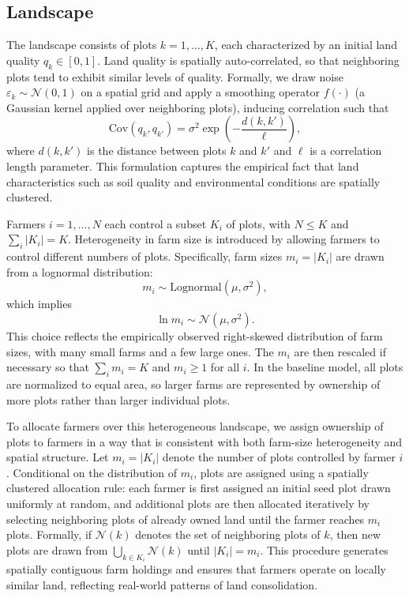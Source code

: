 \documentclass{article}
\begin{document}
\subsection{Landscape}
The landscape consists of plots $k = 1, \dots, K$, each characterized by an initial land quality $q_k \in [0,1]$. Land quality is spatially auto-correlated, so that neighboring plots tend to exhibit similar levels of quality. Formally, we draw noise $\varepsilon_k \sim \mathcal{N}(0,1)$ on a spatial grid and apply a smoothing operator  $f(\cdot)$ (a Gaussian kernel applied over neighboring plots), inducing correlation such that
\[
\text{Cov}(q_k, q_{k'}) = \sigma^2 \exp\left(-\frac{d(k,k')}{\ell}\right),
\]
where $d(k,k')$ is the distance between plots $k$ and $k'$ and $\ell$ is a correlation length parameter. This formulation captures the empirical fact that land characteristics such as soil quality and environmental conditions are spatially clustered.

Farmers $i = 1,\dots,N$ each control a subset $K_i$ of plots, with $N \leq K$ and $\sum_i |K_i| = K$. Heterogeneity in farm size is introduced by allowing farmers to control different numbers of plots. Specifically, farm sizes $m_i = |K_i|$ are drawn from a lognormal distribution:
\[
m_i \sim \text{Lognormal}(\mu, \sigma^2),
\]
which implies
\[
\ln m_i \sim \mathcal{N}(\mu, \sigma^2).
\]
This choice reflects the empirically observed right-skewed distribution of farm sizes, with many small farms and a few large ones. The $m_i$ are then rescaled if necessary so that $\sum_i m_i = K$ and $m_i \geq 1$ for all $i$. In the baseline model, all plots are normalized to equal area, so larger farms are represented by ownership of more plots rather than larger individual plots.

To allocate farmers over this heterogeneous landscape, we assign ownership of plots to farmers in a way that is consistent with both farm-size heterogeneity and spatial structure. Let $m_i = |K_i|$ denote the number of plots controlled by farmer $i$. Conditional on the distribution of $m_i$, plots are assigned using a spatially clustered allocation rule: each farmer is first assigned an initial seed plot drawn uniformly at random, and additional plots are then allocated iteratively by selecting neighboring plots of already owned land until the farmer reaches $m_i$ plots. Formally, if $\mathcal{N}(k)$ denotes the set of neighboring plots of $k$, then new plots are drawn from $\bigcup_{k \in K_i} \mathcal{N}(k)$ until $|K_i| = m_i$. This procedure generates spatially contiguous farm holdings and ensures that farmers operate on locally similar land, reflecting real-world patterns of land consolidation.
\end{document}
